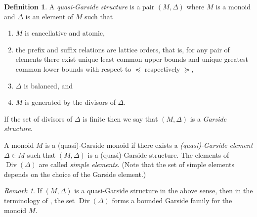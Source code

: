 \documentclass[a4paper,final]{article}
\theoremstyle{plain}
\theoremstyle{remark}
\newtheorem*{remark}{Remark}
\theoremstyle{definition}
\newtheorem{definition}[definition]{Definition}
\begin{document}
\begin{definition}
  A \emph{quasi-Garside structure} is a pair $(M, \Delta)$ where $M$
  is a monoid and $\Delta$ is an element of $M$ such that
  \begin{enumerate}[ (a)] \itemsep 0em \vspace{-0.5\topskip}
  \item $M$ is cancellative and atomic,
  \item the prefix and suffix relations are lattice orders, that is, for any pair of elements there exist unique least common upper bounds and unique greatest common lower bounds with respect to ${\preccurlyeq}$ respectively ${\succcurlyeq}$,
  \item $\Delta$ is balanced, and
  \item $M$ is generated by the divisors of $\Delta$.
  \end{enumerate}
  If the set of divisors of $\Delta$ is finite then we say that $(M, \Delta)$ is a \emph{Garside structure}.

  A monoid $M$ is a (quasi)-Garside monoid if there exists a
  \emph{(quasi)-Garside element} $\Delta \in M$ such that $(M, \Delta)$ is a
  (quasi)-Garside structure.
  The elements of $\operatorname{Div}(\Delta)$ are called \emph{simple elements}.  (Note that the set of simple elements depends on the choice of the Garside element.)
\end{definition}

\begin{remark}
  If $(M,\Delta)$ is a quasi-Garside structure in the above sense, then in the terminology of \cite{GarsideBook}, the set $\operatorname{Div}(\Delta)$ forms a bounded Garside family for the monoid $M$.
\end{remark}
\end{document}
